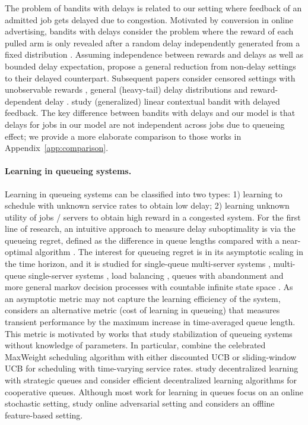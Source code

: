 The problem of bandits with delays is related to our setting where feedback of an admitted job gets delayed due to congestion. Motivated by conversion in online advertising, bandits with delays consider the problem where the reward of each pulled arm is only revealed after a random delay independently generated from a fixed distribution \citep{DudikHKKLRZ11,Chapelle14}. Assuming independence between rewards and delays as well as bounded delay expectation, \cite{JoulaniGS13,MandelLBP15} propose a general reduction from non-delay settings to their delayed counterpart. Subsequent papers consider censored settings with unobservable rewards \citep{VernadeCP17}, general (heavy-tail) delay distributions \citep{ManegueuVCV20, WuW22} and reward-dependent delay \citep{LancewickiSKM21}. \cite{VernadeCLZEB20,blanchet2023delay} study (generalized) linear contextual bandit with delayed feedback. The key difference between bandits with delays and our model is that delays for jobs in our model are not independent across jobs due to queueing effect; we provide a more elaborate comparison to those works in Appendix~\ref{app:comparison}. 

\paragraph{Learning in queueing systems.} Learning in queueing systems can be classified into two types: 1) learning to schedule with unknown service rates to obtain low delay; 2) learning unknown utility of jobs / servers to obtain high reward in a congested system. For the first line of research, an intuitive approach to measure delay suboptimality is via the queueing regret, defined as the difference in queue lengths compared with a near-optimal algorithm \citep{walton2021learning}. The interest for queueing regret is in its asymptotic scaling in the time horizon, and it is studied for single-queue multi-server systems \citep{Walton14,KrishnasamySJS21,StahlbuhkSM21}, multi-queue single-server systems \citep{krishnasamy2018learning}, load balancing \citep{choudhury2021job}, queues with abandonment \citep{zhong2022learning} and more general markov decision processes with countable infinite state space \citep{adler2023bayesian}. As an asymptotic metric may not capture the learning efficiency of the system, \cite{freund2023quantifying} considers an alternative metric (cost of learning in queueing) that measures transient performance by the maximum increase in time-averaged queue length. This metric is motivated by works that study stabilization of queueing systems without knowledge of parameters. In particular, \cite{NeelyRP12,yang2023learning,nguyen2023learning} combine the celebrated MaxWeight scheduling algorithm \citep{tassiulas1992stability} with either discounted UCB or sliding-window UCB for scheduling with time-varying service rates. \cite{FuHL22,gaitonde2023price} study decentralized learning with strategic queues and \cite{StahlbuhkSM19,sentenac2021decentralized,FreundLW22} consider efficient decentralized learning algorithms for cooperative queues. Although most work for learning in queues focus on an online stochastic setting, \cite{huang2023queue,liang2018minimizing} study online adversarial setting and \cite{singh2022feature} considers an offline feature-based setting.

